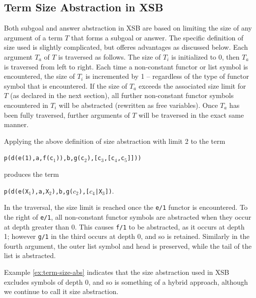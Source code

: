 \subsection{Term Size Abstraction in XSB} \label{sec:size-metric}
%
Both subgoal and answer abstraction in XSB are based on limiting the
size of any argument of a term $T$ that forms a subgoal or answer.
The specific definition of size used is slightly complicated, but
offeres advantages as discussed below.  Each argument $T_a$ of $T$ is
traversed as follows.  The size of $T_i$ is initialized to 0, then
$T_a$ is traversed from left to right.  Each time a non-constant
functor or list symbol is encountered, the size of $T_i$ is
incremented by 1 -- regardless of the type of functor symbol that is
encountered.  If the size of $T_a$ exceeds the associated size limit
for $T$ (as declared in the next section), all further non-constant
functor symbols encountered in $T_i$ will be abstracted (rewritten as
free variables).  Once $T_a$ has been fully traversed, further
arguments of $T$ will be traversed in the exact same manner.


\begin{example} \label{ex:term-size-abs}
Applying the above definition of size abstraction with limit 2 to the
term 

{\tt p(d(e(1),a,f(c$_1$)),b,g(c$_2$),[c$_3$,[c$_4$,c$_5$]]))}

\noindent
  produces the term 

{\tt p(d(e(X$_1$),a,X$_2$),b,g($c_2$),[$c_4$|X$_3$])}.  

\noindent
In the traversal, the size limit is reached once the {\tt e/1} functor
is encountered.  To the right of {\tt e/1}, all non-constant functor
symbols are abstracted when they occur at depth greater than 0.  This
causes {\tt f/1} to be abstracted, as it occurs at depth 1; however
{\tt g/1} in the third occurs at depth 0, and so is retained.
Similarly in the fourth argument, the outer list symbol and head is
preserved, while the tail of the list is abstracted.
\end{example}

Example \ref{ex:term-size-abs} indicates that the size abstraction
used in XSB excludes symbols of depth 0, and so is something of a
hybrid approach, although we continue to call it size abstraction.

